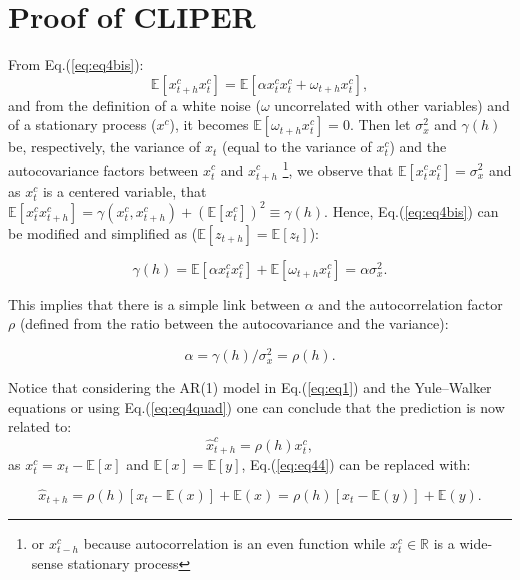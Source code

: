 \documentclass[preprint,12pt,3p]{elsarticle}
\begin{document}
 \section{Proof of CLIPER}
 \label{appendix:cliper}
 From Eq.(\ref{eq:eq4bis}):
 \begin{equation}
\mathbb{E}[x^c_{t+h}x^c_{t}]=\mathbb{E}[\alpha x^c_tx^c_t+\omega_{t+h}x^c_t],
\end{equation}
 and from the definition of a white noise ($\omega$ uncorrelated with other variables) and of a stationary process ($x^c$), it becomes $\mathbb{E}[\omega_{t+h}x^c_t]=0$. Then let $\sigma_{x}^2$ and $\gamma(h)$ be, respectively, the variance of $x_t$ (equal to the variance of $x^c_t$) and the autocovariance factors \citep{MakridakisSpyrosG1998F} between $x^c_t$ and $x^c_{t+h}$ \footnote{or $x^c_{t-h}$ because autocorrelation is an even function while $x^c_t\in \mathbb{R}$ is a wide-sense stationary process}, we observe that  $\mathbb{E}[x^c_{t}x^c_{t}]=\sigma_x^2$ and as $x^c_t$ is a centered variable, that $\mathbb{E}[x^c_{t}x^c_{t+h}]=\gamma(x^c_{t},x^c_{t+h})+(\mathbb{E}[x^c_t])^2\equiv\gamma(h)$.
Hence, Eq.(\ref{eq:eq4bis}) can be modified and simplified as ($\mathbb{E}[z_{t+h}]=\mathbb{E}[z_t]$):

\begin{equation}
\label{eq:eq4ter}
\gamma(h)=\mathbb{E}[\alpha x^c_tx^c_t]+\mathbb{E}[\omega_{t+h}x^c_t]=\alpha \sigma_x^2. 
\end{equation}

This implies that there is a simple link between $\alpha$ and the autocorrelation factor $\rho$ (defined from the ratio between the autocovariance and the variance):

\begin{equation}
\label{eq:eq4quad}
\alpha=\gamma(h)/\sigma_x^2=\rho(h).
\end{equation}

Notice that considering the AR(1) model in Eq.(\ref{eq:eq1}) and the Yule--Walker equations or using Eq.(\ref{eq:eq4quad}) one can conclude that the prediction is now related to: 
\begin{equation}
\label{eq:eq44}
\widehat{x}^c_{t+h}=\rho(h)  x^c_t,
\end{equation}
\noindent as $x^c_t=x_t-\mathbb{E}[x]$ and $\mathbb{E}[x]=\mathbb{E}[y]$, Eq.(\ref{eq:eq44}) can be replaced with:

\begin{equation}
\label{eq:eq45}
\widehat{x}_{t+h}=\rho(h)  \left[x_t-\mathbb{E}(x)\right] +\mathbb{E}(x)=\rho(h)  \left[x_t-\mathbb{E}(y)\right] +\mathbb{E}(y).
\end{equation}
\end{document}
